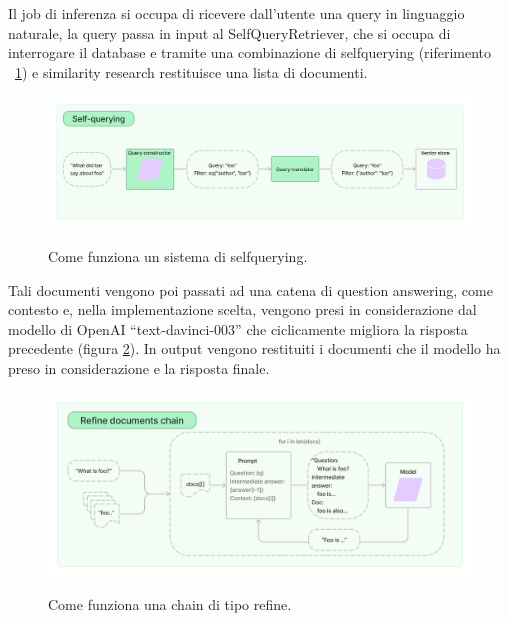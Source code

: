 Il job di inferenza si occupa di ricevere dall'utente una query in linguaggio naturale, la query passa in input al SelfQueryRetriever, 
che si occupa di interrogare il database e tramite una combinazione di selfquerying (riferimento ~\ref{fig:selfquery}) e similarity research restituisce una lista di documenti.
\begin{figure}
    \centering
    \includegraphics[width=0.7\pdfpagewidth]{images/selfquery.jpg}\label{fig:selfquery}
    \caption[Ingestion]{Come funziona un sistema di selfquerying.}
\end{figure}

Tali documenti vengono poi passati ad una catena di question answering, come contesto e, nella implementazione scelta, vengono presi in considerazione dal modello di OpenAI ``text-davinci-003'' che ciclicamente migliora la risposta precedente (figura \ref{fig:refine}).
In output vengono restituiti i documenti che il modello ha preso in considerazione e la risposta finale.

\begin{figure}
    \centering
    \includegraphics[width=0.7\pdfpagewidth]{images/refine.jpg}\label{fig:refine}
    \caption[Ingestion]{Come funziona una chain di tipo refine.}
\end{figure}

